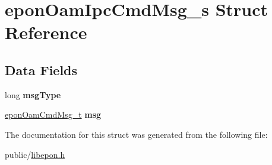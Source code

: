 \hypertarget{structeponOamIpcCmdMsg__s}{}\section{epon\+Oam\+Ipc\+Cmd\+Msg\+\_\+s Struct Reference}
\label{structeponOamIpcCmdMsg__s}
\subsection*{Data Fields}
\begin{DoxyCompactItemize}
\item 
\mbox{\label{structeponOamIpcCmdMsg__s_a7edf5beaa8edcc749a57dd641aad8cb4}} 
long {\bfseries msg\+Type}
\item 
\mbox{\label{structeponOamIpcCmdMsg__s_af51aa67ed23156654b867f14a9c6f1f7}} 
\hyperlink{structeponOamCmdMsg__s}{epon\+Oam\+Cmd\+Msg\+\_\+t} {\bfseries msg}
\end{DoxyCompactItemize}


The documentation for this struct was generated from the following file\+:\begin{DoxyCompactItemize}
\item 
public/\hyperlink{libepon_8h}{libepon.\+h}\end{DoxyCompactItemize}

